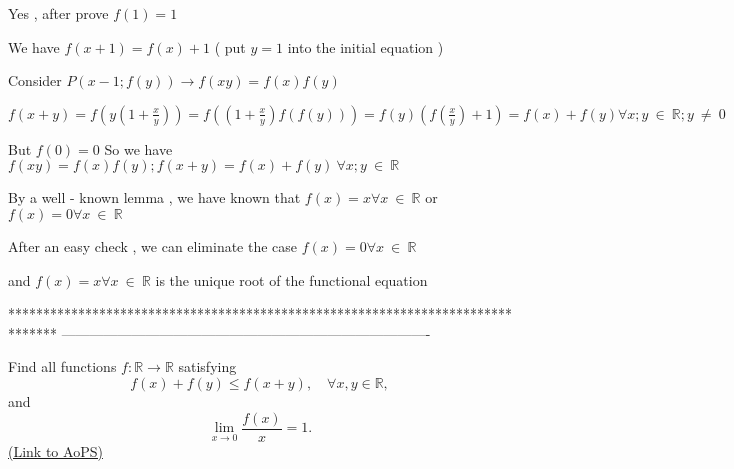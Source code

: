 \begin{solution}
	\begin{italicized}Yes , after prove $ f(1) = 1$

   We have $ f(x + 1) = f(x) + 1$ ( put $ y = 1$ into the initial equation )

 Consider $ P( x - 1; f(y) ) \rightarrow f(xy) = f(x) f(y)$

  $ f(x + y) = f \left(y \left( 1 + \frac {x}{y} \right) \right) = f \left( \left( 1 + \frac {x}{y} \right) f(f(y))\right) = f(y)\left( f \left( \frac {x}{y} \right) + 1 \right) = f(x) + f(y) \forall x ; y \ \in \ \mathbb{R} ; y \ \neq \ 0$
  
But $ f(0) = 0$
 So we have $ f(xy) = f(x) f(y) ; f(x + y) = f(x) + f(y) \ \forall x ; y \ \in \ \mathbb{R}$

  By a well - known lemma , we have known that $ f(x) = x \forall x \ \in \ \mathbb{R}$
or $ f(x) = 0 \forall x \ \in \ \mathbb{R}$

  After an easy check , we can eliminate the case $ f(x) = 0 \forall x \ \in \ \mathbb{R}$

 and $ f(x) = x \forall x \ \in \ \mathbb{R}$ is the unique root of the functional equation  \end{italicized}
\end{solution}
*******************************************************************************
-------------------------------------------------------------------------------

\begin{problem}
	Find all functions $f: \mathbb R \to \mathbb R$ satisfying 
\[f(x) + f(y) \leq f(x+y), \quad \forall x,y \in \mathbb R,\]
and \[\lim_{x\to 0}\frac{f(x)}{x} = 1.\]
	\flushright \href{https://artofproblemsolving.com/community/c6h297362}{(Link to AoPS)}
\end{problem}



